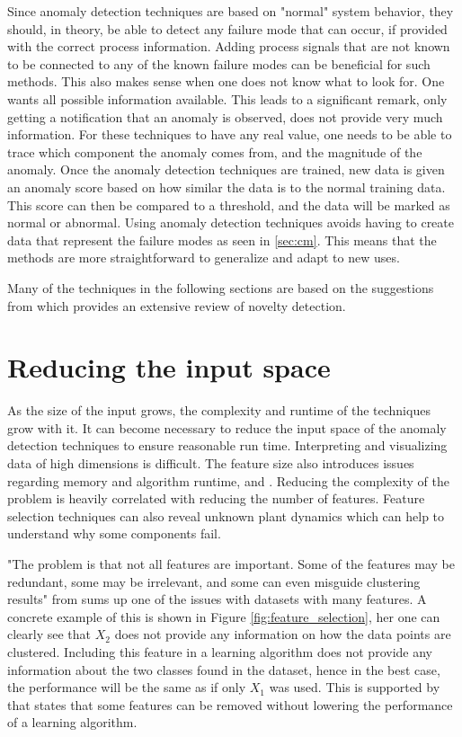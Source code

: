     Since anomaly detection techniques are based on "normal" system behavior, they should, in theory, be able to detect any failure mode that can occur, if provided with the correct process information. Adding process signals that are not known to be connected to any of the known failure modes can be beneficial for such methods. This also makes sense when one does not know what to look for. One wants all possible information available. This leads to a significant remark, only getting a notification that an anomaly is observed, does not provide very much information. For these techniques to have any real value, one needs to be able to trace which component the anomaly comes from, and the magnitude of the anomaly. Once the anomaly detection techniques are trained, new data is given an anomaly score based on how similar the data is to the normal training data. This score can then be compared to a threshold, and the data will be marked as normal or abnormal. Using anomaly detection techniques avoids having to create data that represent the failure modes as seen in \ref{sec:cm}. This means that the methods are more straightforward to generalize and adapt to new uses. 

    Many of the techniques in the following sections are based on the suggestions from \cite{Pimentel2014} which provides an extensive review of novelty detection. 

\section{Reducing the input space}\label{sec:reduce_features}
    As the size of the input grows, the complexity and runtime of the techniques grow with it. It can become necessary to reduce the input space of the anomaly detection techniques to ensure reasonable run time. Interpreting and visualizing data of high dimensions is difficult. The feature size also introduces issues regarding memory and algorithm runtime, \cite{Guyon2003} and \cite{Dy2004}. Reducing the complexity of the problem is heavily correlated with reducing the number of features. Feature selection techniques can also reveal unknown plant dynamics which can help to understand why some components fail.
    
    "The problem is that not all features are important. Some of the features may be redundant, some may be irrelevant, and some can even misguide clustering results" from \cite{Dy2004} sums up one of the issues with datasets with many features. A concrete example of this is shown in Figure \ref{fig:feature_selection}, her one can clearly see that $X_2$ does not provide any information on how the data points are clustered. Including this feature in a learning algorithm does not provide any information about the two classes found in the dataset, hence in the best case, the performance will be the same as if only $X_1$ was used. This is supported by \cite{Liu2010} that states that some features can be removed without lowering the performance of a learning algorithm.
    
